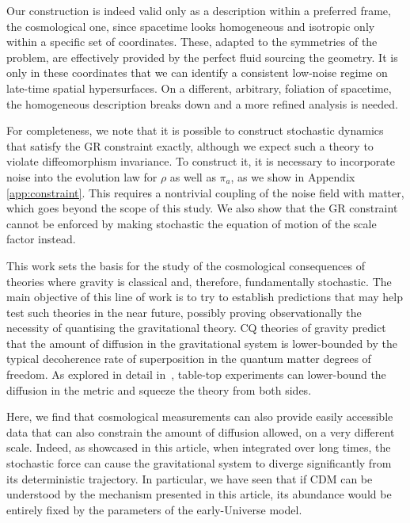 \documentclass[amsmath,amssymb,11pt]{article}
\begin{document}
Our construction is indeed valid only as a description within a preferred frame, the cosmological one, since spacetime looks homogeneous and isotropic only within a specific set of coordinates. These, adapted to the symmetries of the problem, are effectively provided by the perfect fluid sourcing the geometry. It is only in these coordinates that we can identify a consistent low-noise regime on late-time spatial hypersurfaces. On a different, arbitrary, foliation of spacetime, the homogeneous description breaks down and a more refined analysis is needed.

For completeness, we note that it is possible to construct stochastic dynamics that satisfy the GR constraint exactly, although we expect such a theory to violate diffeomorphism invariance. To construct it, it is necessary to incorporate noise into the evolution law for $\rho$ as well as $\pi_a$, as we show in Appendix \ref{app:constraint}. This requires a nontrivial coupling of the noise field with matter, which goes beyond the scope of this study. We also show that the GR constraint cannot be enforced by making stochastic the equation of motion of the scale factor instead.

This work sets the basis for the study of the cosmological consequences of theories where gravity is classical and, therefore, fundamentally stochastic. The main objective of this line of work is to try to establish predictions that may help test such theories in the near future, possibly proving observationally the necessity of quantising the gravitational theory. CQ theories of gravity predict that the amount of diffusion in the gravitational system is lower-bounded by the typical decoherence rate of superposition in the quantum matter degrees of freedom. As explored in detail in~\cite{oppenheim2023gravitationally}, table-top experiments can lower-bound the diffusion in the metric and squeeze the theory from both sides.

Here, we find that cosmological measurements can also provide easily accessible data that can also constrain the amount of diffusion allowed, on a very different scale. Indeed, as showcased in this article, when integrated over long times, the stochastic force can cause the gravitational system to diverge significantly from its deterministic trajectory. In particular, we have seen that if CDM can be understood by the mechanism presented in this article, its abundance would be entirely fixed by the parameters of the early-Universe model.
\end{document}
